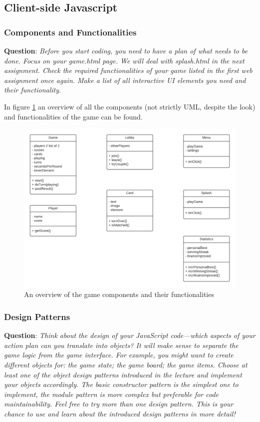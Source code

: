\documentclass{article}
\begin{document}
\subsection{Client-side Javascript}

\subsubsection{Components and Functionalities}
\textbf{Question}: \textit{Before you start coding, you need to have a plan of what needs to be done. Focus on your game.html page. We will deal with splash.html in the next assignment. Check the required functionalities of your game listed in the first web assignment once again. Make a list of all interactive UI elements you need and their functionality.}

In figure \ref{fig:uml_components} an overview of all the components (not strictly UML, despite the look) and functionalities of the game can be found. 

\begin{figure}[t]
    \centering
    \includegraphics[height=0.5\textheight]{uml-memorio.png}
    \caption{An overview of the game components and their functionalities}
    \label{fig:uml_components}
\end{figure}

\subsubsection{Design Patterns}

\textbf{Question}: \textit{Think about the design of your JavaScript code—which aspects of your action plan can you translate into objects? It will make sense to separate the game logic from the game interface. For example, you might want to create different objects for: the game state; the game board; the game items. Choose at least one of the object design patterns introduced in the lecture and implement your objects accordingly. The basic constructor pattern is the simplest one to implement, the module pattern is more complex but preferable for code maintainability. Feel free to try more than one design pattern. This is your chance to use and learn about the introduced design patterns in more detail!}
\end{document}
